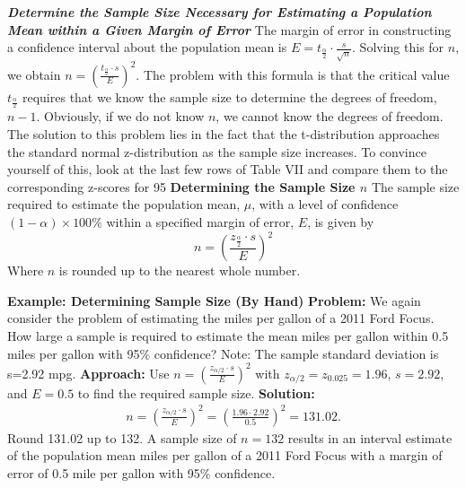 \documentclass{report}
\begin{document}
    \bigbreak \noindent \bigbreak \noindent 
    \textbf{\textit{Determine the Sample Size Necessary for Estimating a Population Mean within a Given Margin of Error}}
    \bigbreak \noindent 
    The margin of error in constructing a confidence interval about the population mean is \( E = t_{\frac{\alpha}{2}} \cdot \frac{s}{\sqrt{n}} \).
    \bigbreak \noindent 
    Solving this for \( n \), we obtain \( n = \left(\frac{t_{\frac{\alpha}{2}} \cdot s}{E}\right)^2 \).
    \bigbreak \noindent 
    The problem with this formula is that the critical value \( t_{\frac{\alpha}{2}} \) requires that we know the sample size to determine the degrees of freedom, \( n - 1 \). Obviously, if we do not know \( n \), we cannot know the degrees of freedom.
    \bigbreak \noindent 
    The solution to this problem lies in the fact that the t-distribution approaches the standard normal z-distribution as the sample size increases. To convince yourself of this, look at the last few rows of Table VII and compare them to the corresponding z-scores for 95%
    \bigbreak \noindent 
    \textbf{Determining the Sample Size $n $}
    \bigbreak \noindent 
    The sample size required to estimate the population mean, \( \mu \), with a level of confidence \((1 - \alpha) \times 100\%\) within a specified margin of error, \( E \), is given by
    \bigbreak \noindent 
    \[ n = \left( \frac{z_{\frac{\alpha}{2}} \cdot s}{E} \right)^2 \]
    \bigbreak \noindent 
    Where \( n \) is rounded up to the nearest whole number.
    
    \pagebreak 
    \bigbreak \noindent 
    \begin{mdframed}
      \textbf{Example: Determining Sample Size (By Hand)}
      \bigbreak \noindent 
      \textbf{Problem:}
        We again consider the problem of estimating the miles per gallon of a 2011 Ford Focus. How large a sample is required to estimate the mean miles per gallon within 0.5 miles per gallon with 95\% confidence? Note: The sample standard deviation is s=2.92 mpg.
        \bigbreak \noindent 
        \textbf{Approach:}
        Use $n=\left(\frac{z_{\alpha/2}\cdot s}{E}\right)^2$ with $z_{\alpha/2}=z_{0.025}=1.96$, $s=2.92$, and $E=0.5$ to find the required sample size.
        \bigbreak \noindent 
        \textbf{Solution:}
        \bigbreak \noindent 
        \begin{align*}
            n = \left(\frac{z_{\alpha/2}\cdot s}{E}\right)^2 = \left(\frac{1.96 \cdot 2.92}{0.5}\right)^2 = 131.02
        .\end{align*}
        \bigbreak \noindent 
        Round 131.02 up to 132. A sample size of $n=132$ results in an interval estimate of the population mean miles per gallon of a 2011 Ford Focus with a margin of error of 0.5 mile per gallon with 95\% confidence.
    \end{mdframed}
\end{document}
